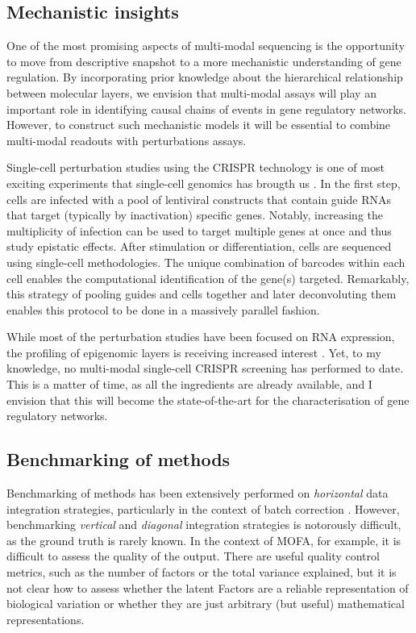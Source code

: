 \subsection{Mechanistic insights}

One of the most promising aspects of multi-modal sequencing is the opportunity to move from descriptive snapshot to a more mechanistic understanding of gene regulation. By incorporating prior knowledge about the hierarchical relationship between molecular layers, we envision that multi-modal assays will play an important role in identifying causal chains of events in gene regulatory networks. However, to construct such mechanistic models it will be essential to combine multi-modal readouts with perturbations assays.

Single-cell perturbation studies using the CRISPR technology is one of most exciting experiments that single-cell genomics has brougth us \cite{Dixit2016,Datlinger2017,Jaitin2016,Alda-Catalinas2020}. In the first step, cells are infected with a pool of lentiviral constructs that contain guide RNAs that target (typically by inactivation) specific genes. Notably, increasing the multiplicity of infection can be used to target multiple genes at once and thus study epistatic effects. After stimulation or differentiation, cells are sequenced using single-cell  methodologies. The unique combination of barcodes within each cell enables the computational identification of the gene(s) targeted. Remarkably, this strategy of pooling guides and cells together and later deconvoluting them enables this protocol to be done in a massively parallel fashion.

While most of the perturbation studies have been focused on RNA expression, the profiling of epigenomic layers is receiving increased interest \cite{Rubin2019}. Yet, to my knowledge, no multi-modal single-cell CRISPR screening has performed to date. This is a matter of time, as all the ingredients are already available, and I envision that this will become the state-of-the-art for the characterisation of gene regulatory networks.


\subsection{Benchmarking of methods} 

Benchmarking of methods has been extensively performed on \textit{horizontal} data integration strategies, particularly in the context of batch correction \cite{Luecken2020,Tran2020}. However, benchmarking \textit{vertical} and \textit{diagonal} integration strategies is notorously difficult, as the ground truth is rarely known. In the context of MOFA, for example, it is difficult to assess the quality of the output. There are useful quality control metrics, such as the number of factors or the total variance explained, but it is not clear how to assess whether the latent Factors are a reliable representation of biological variation or whether they are just arbitrary (but useful) mathematical representations.

